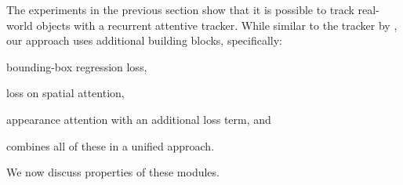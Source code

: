   
    The experiments in the previous section show that it is possible to track real-world objects with a recurrent attentive tracker. While similar to the tracker by \citet{Kahou2015ratm}, our approach uses additional building blocks, specifically: 
	\begin{inparaenum}[(i)]
        \item bounding-box regression loss,
        \item loss on spatial attention,
        \item appearance attention with an additional loss term, and
        \item combines all of these in a unified approach.
	\end{inparaenum}
    We now discuss properties of these modules.
